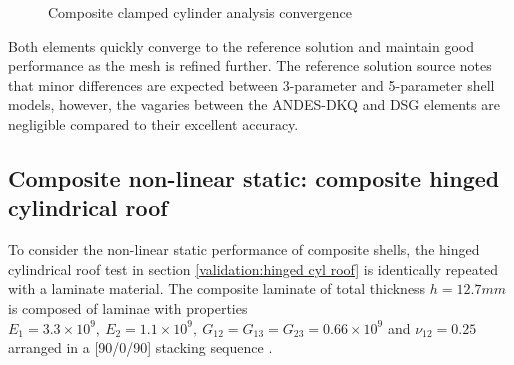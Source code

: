 \begin{figure}[H]
	\caption{\label{Composite_clamped_cylinder_test}Composite clamped cylinder analysis convergence}
\end{figure}

Both elements quickly converge to the reference solution and maintain good performance as the mesh is refined further. The reference solution source \cite{reddy2004mechanics} notes that minor differences are expected between 3-parameter and 5-parameter shell models, however, the vagaries between the ANDES-DKQ and DSG elements are negligible compared to their excellent accuracy.

\subsection{Composite non-linear static: composite hinged cylindrical roof}

To consider the non-linear static performance of composite shells, the hinged cylindrical roof test in section \ref{validation:hinged cyl roof} is identically repeated with a laminate material. The composite laminate of total thickness $h = 12.7mm$ is composed of laminae with properties $E_1 = 3.3\times10^9,\ E_2 = 1.1\times10^9,\ G_{12} = G_{13} = G_{23} = 0.66\times10^9$ and $\nu_{12} = 0.25$ arranged in a [90/0/90] stacking sequence \cite{Sze2004}.

